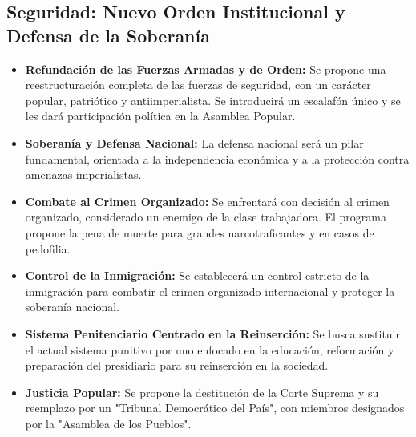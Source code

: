 \documentclass[a4paper, 11pt]{article}
\begin{document}
\subsection{Seguridad: Nuevo Orden Institucional y Defensa de la Soberanía}
\begin{itemize}
    \item \textbf{Refundación de las Fuerzas Armadas y de Orden:} Se propone una reestructuración completa de las fuerzas de seguridad, con un carácter popular, patriótico y antiimperialista. Se introducirá un escalafón único y se les dará participación política en la Asamblea Popular.

    \item \textbf{Soberanía y Defensa Nacional:} La defensa nacional será un pilar fundamental, orientada a la independencia económica y a la protección contra amenazas imperialistas.

    \item \textbf{Combate al Crimen Organizado:} Se enfrentará con decisión al crimen organizado, considerado un enemigo de la clase trabajadora. El programa propone la pena de muerte para grandes narcotraficantes y en casos de pedofilia.

    \item \textbf{Control de la Inmigración:} Se establecerá un control estricto de la inmigración para combatir el crimen organizado internacional y proteger la soberanía nacional.

    \item \textbf{Sistema Penitenciario Centrado en la Reinserción:} Se busca sustituir el actual sistema punitivo por uno enfocado en la educación, reformación y preparación del presidiario para su reinserción en la sociedad.

    \item \textbf{Justicia Popular:} Se propone la destitución de la Corte Suprema y su reemplazo por un "Tribunal Democrático del País", con miembros designados por la "Asamblea de los Pueblos".
\end{itemize}

\end{document}
